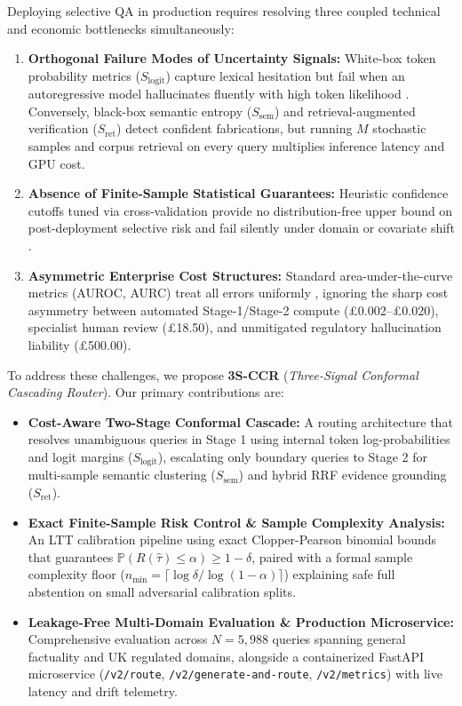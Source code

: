 \documentclass[10pt,conference]{IEEEtran}
\begin{document}
Deploying selective QA in production requires resolving three coupled technical and economic bottlenecks simultaneously:
\begin{enumerate}
    \item \textbf{Orthogonal Failure Modes of Uncertainty Signals:} White-box token probability metrics ($S_{\text{logit}}$) capture lexical hesitation \cite{guo2017calibration,kadavath2022language,jiang2021can} but fail when an autoregressive model hallucinates fluently with high token likelihood \cite{azaria2023internal,burns2023discovering}. Conversely, black-box semantic entropy ($S_{\text{sem}}$) \cite{kuhn2023semantic,farquhar2024detecting} and retrieval-augmented verification ($S_{\text{ret}}$) \cite{lewis2020retrieval,manakul2023selfcheckgpt,min2023factscore} detect confident fabrications, but running $M$ stochastic samples and corpus retrieval on every query multiplies inference latency and GPU cost.
    \item \textbf{Absence of Finite-Sample Statistical Guarantees:} Heuristic confidence cutoffs tuned via cross-validation provide no distribution-free upper bound on post-deployment selective risk and fail silently under domain or covariate shift \cite{ovadia2019can}.
    \item \textbf{Asymmetric Enterprise Cost Structures:} Standard area-under-the-curve metrics (AUROC, AURC) treat all errors uniformly \cite{geifman2019selectivenet,jaeger2023call}, ignoring the sharp cost asymmetry between automated Stage-1/Stage-2 compute (\pounds0.002--\pounds0.020), specialist human review (\pounds18.50), and unmitigated regulatory hallucination liability (\pounds500.00).
\end{enumerate}

To address these challenges, we propose \textbf{3S-CCR} (\emph{Three-Signal Conformal Cascading Router}). Our primary contributions are:
\begin{itemize}
    \item \textbf{Cost-Aware Two-Stage Conformal Cascade:} A routing architecture that resolves unambiguous queries in Stage 1 using internal token log-probabilities and logit margins ($S_{\text{logit}}$), escalating only boundary queries to Stage 2 for multi-sample semantic clustering ($S_{\text{sem}}$) and hybrid RRF evidence grounding ($S_{\text{ret}}$).
    \item \textbf{Exact Finite-Sample Risk Control \& Sample Complexity Analysis:} An LTT calibration pipeline using exact Clopper-Pearson binomial bounds \cite{clopper1934use,angelopoulos2022ltt} that guarantees $\mathbb{P}(R(\hat{\tau}) \le \alpha) \ge 1 - \delta$, paired with a formal sample complexity floor ($n_{\min} = \lceil \log \delta / \log(1-\alpha) \rceil$) explaining safe full abstention on small adversarial calibration splits.
    \item \textbf{Leakage-Free Multi-Domain Evaluation \& Production Microservice:} Comprehensive evaluation across $N=5,988$ queries spanning general factuality and UK regulated domains, alongside a containerized FastAPI microservice (\texttt{/v2/route}, \texttt{/v2/generate-and-route}, \texttt{/v2/metrics}) with live latency and drift telemetry.
\end{itemize}
\end{document}
